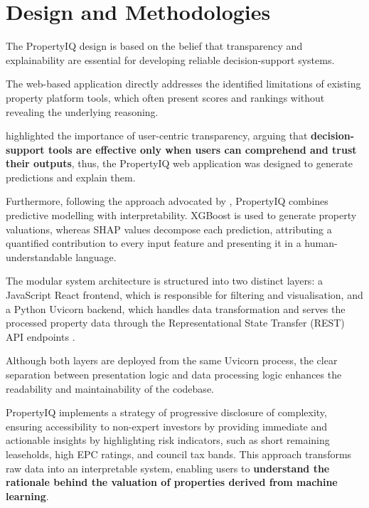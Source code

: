 \chapter{Design and Methodologies}\label{ch:Design}

The PropertyIQ design is based on the belief that transparency and explainability are essential for developing reliable decision-support systems. 

The web-based application directly addresses the identified limitations of existing property platform tools, which often present scores and rankings without revealing the underlying reasoning. 

\textcite{Ribeiro2016} highlighted the importance of user-centric transparency, arguing that \textbf{decision-support tools are effective only when users can comprehend and trust their outputs}, thus, the PropertyIQ web application was designed to generate predictions and explain them. 

Furthermore, following the approach advocated by \textcite{Lundberg2017}, PropertyIQ combines predictive modelling with interpretability. XGBoost \parencite{Chen2016} is used to generate property valuations, whereas SHAP \parencite{Lundberg2017} values decompose each prediction, attributing a quantified contribution to every input feature and presenting it in a human-understandable language.

The modular system architecture is structured into two distinct layers: a JavaScript React \parencite{Meta2026} frontend, which is responsible for filtering and visualisation, and a Python Uvicorn \parencite{Trylesinski2026} backend, which handles data transformation and serves the processed property data through the Representational State Transfer (REST) API endpoints \parencite{Powell2025}.

Although both layers are deployed from the same Uvicorn process, the clear separation between presentation logic and data processing logic enhances the readability and maintainability of the codebase.

PropertyIQ implements a strategy of progressive disclosure of complexity, ensuring accessibility to non-expert investors by providing immediate and actionable insights by highlighting risk indicators, such as short remaining leaseholds, high EPC ratings, and council tax bands. This approach transforms raw data into an interpretable system, enabling users to \textbf{understand the rationale behind the valuation of properties derived from machine learning}.


